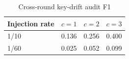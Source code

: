 \begin{table}[htbp]
\centering
\begin{tabular}{lrrr}
\toprule
Injection rate & $c=1$ & $c=2$ & $c=3$ \\
\midrule
1/10 & 0.136 & 0.256 & 0.400 \\
1/60 & 0.025 & 0.052 & 0.099 \\
\bottomrule
\end{tabular}
\caption{Cross-round key-drift audit F1}
\label{tab:table4}
\end{table}
